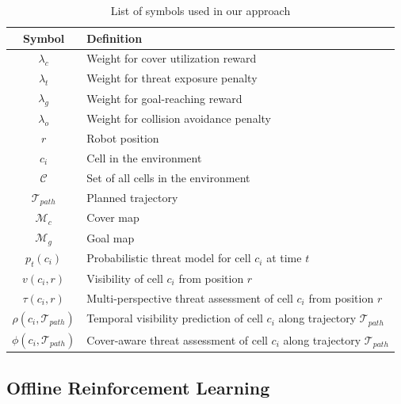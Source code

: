 \begin{table}[ht]
\centering

\begin{tabular}{|c|p{6cm}|}
\hline
\textbf{Symbol} & \textbf{Definition} \\ \hline
$\lambda_c$ & Weight for cover utilization reward \\ \hline
$\lambda_t$ & Weight for threat exposure penalty \\ \hline
$\lambda_g$ & Weight for goal-reaching reward \\ \hline
$\lambda_o$ & Weight for collision avoidance penalty \\ \hline
$r$ & Robot position \\ \hline
$c_i$ & Cell in the environment \\ \hline
$\mathcal{C}$ & Set of all cells in the environment \\ \hline
$\mathcal{T}_{path}$ & Planned trajectory \\ \hline
$\mathcal{M}_c$ & Cover map \\ \hline
$\mathcal{M}_g$ & Goal map \\ \hline
$p_t(c_i)$ & Probabilistic threat model for cell $c_i$ \newline at time $t$ \\ \hline
$v(c_i, r)$ & Visibility of cell $c_i$ from position $r$ \\ \hline
$\tau(c_i, r)$ & Multi-perspective threat assessment of \newline cell $c_i$ from position $r$ \\ \hline
$\rho(c_i, \mathcal{T}_{path})$ & Temporal visibility prediction of \newline cell $c_i$ along trajectory $\mathcal{T}_{path}$ \\ \hline
$\phi(c_i, \mathcal{T}_{path})$ & Cover-aware threat assessment of \newline cell $c_i$ along trajectory $\mathcal{T}_{path}$ \\ \hline
\end{tabular}
\caption{List of symbols used in our approach}
\label{tab:symbols_definitions}
\end{table}


\subsection{Offline Reinforcement Learning}

